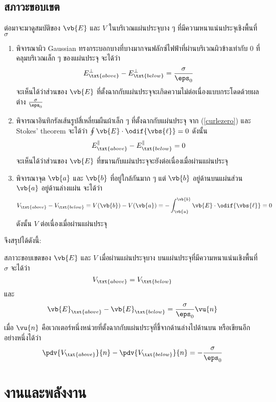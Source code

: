 \subsection{สภาวะขอบเขต}
ต่อมาจะมาดูสมบัติของ $\vb{E}$ และ $V$ ในบริเวณแผ่นประจุบาง ๆ ที่มีความหนาแน่นประจุเชิงพื้นที่ $\sigma$
\begin{enumerate}
    \item พิจารณาผิว Gaussian ทรงกระบอกบางที่บางมากจนฟลักซ์ไฟฟ้าที่ผ่านบริเวณผิวข้างเท่ากับ $0$ ที่คลุมบริเวณเล็ก ๆ ของแผ่นประจุ จะได้ว่า
    \[ 
    E^\perp_\txt{above}-E^\perp_\txt{below}=\frac{\sigma}{\eps_0}
    \]
    จะเห็นได้ว่าส่วนของ $\vb{E}$ ที่ตั้งฉากกับแผ่นประจุจะเกิดความไม่ต่อเนื่องแบบกระโดดด้วยผลต่าง $\frac{\sigma}{\eps_0}$
    \item พิจารณาอินทิกรัลเส้นรูปสี่เหลี่ยมผืนผ้าเล็ก ๆ ที่ตั้งฉากกับแผ่นประจุ จาก (\ref{curlezero}) และ Stokes' theorem จะได้ว่า $\oint\vb{E}\cdot\odif{\vbs{\ell}}=0$ ดังนั้น
    \[ 
    E^\|_\txt{above}-E^\|_\txt{below}=0
    \]
    จะเห็นได้ว่าส่วนของ $\vb{E}$ ที่ขนานกับแผ่นประจุจะยังต่อเนื่องเมื่อผ่านแผ่นประจุ
    \item พิจารณาจุด $\vb{a}$ และ $\vb{b}$ ที่อยู่ใกล้กันมาก ๆ แต่ $\vb{b}$ อยู่ด้านบนแผ่นส่วน $\vb{a}$ อยู่ด้านล่างแผ่น จะได้ว่า
    \[ 
    V_\txt{above}-V_\txt{below}=V(\vb{b})-V(\vb{a})=-\int_\vb{a}^\vb{b}\vb{E}\cdot\odif{\vbs{\ell}}=0
    \]
    ดังนั้น $V$ ต่อเนื่องเมื่อผ่านแผ่นประจุ
\end{enumerate}
จึงสรุปได้ดังนี้:
\begin{lawbox}{สภาวะขอบเขตของ $\vb{E}$ และ $V$ เมื่อผ่านแผ่นประจุบาง}
    บนแผ่นประจุที่มีความหนาแน่นเชิงพื้นที่ $\sigma$ จะได้ว่า
    \begin{equation}
        V_\txt{above}=V_\txt{below}\label{boundarystart}
    \end{equation}
    และ
    \begin{equation}
        \vb{E}_\txt{above}-\vb{E}_\txt{below}=\frac{\sigma}{\eps_0}\vu{n}
    \end{equation}
    เมื่อ $\vu{n}$ คือเวกเตอร์หนึ่งหน่วยที่ตั้งฉากกับแผ่นประจุที่ชี้จากด้านล่างไปด้านบน หรือเขียนอีกอย่างหนึ่งได้ว่า
    \begin{equation}
        \pdv{V_\txt{above}}{n}-\pdv{V_\txt{below}}{n}=-\frac{\sigma}{\eps_0}\label{boundaryend}
    \end{equation}
\end{lawbox}

\section{งานและพลังงาน}
